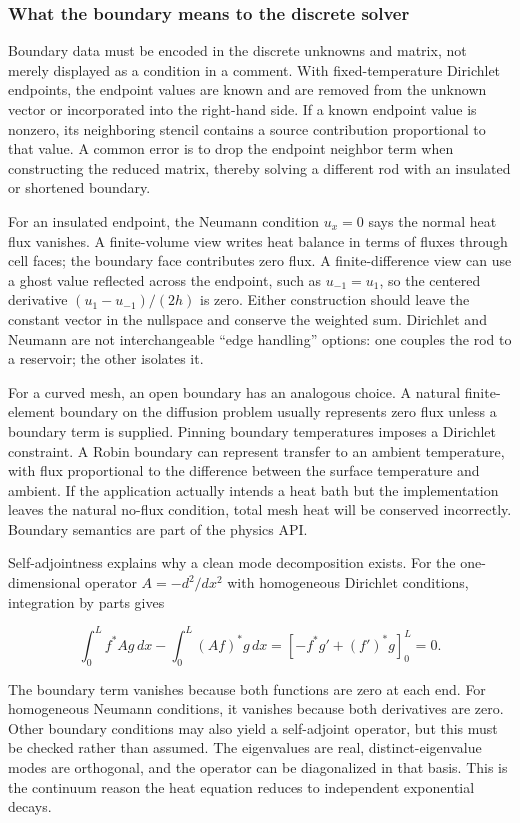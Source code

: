 \subsubsection{What the boundary means to the discrete solver}\label{02-foundations-ii-ch025-what-the-boundary-means-to-the-discrete-solver}

Boundary data must be encoded in the discrete unknowns and matrix, not merely displayed as a condition in a comment. With fixed-temperature Dirichlet endpoints, the endpoint values are known and are removed from the unknown vector or incorporated into the right-hand side. If a known endpoint value is nonzero, its neighboring stencil contains a source contribution proportional to that value. A common error is to drop the endpoint neighbor term when constructing the reduced matrix, thereby solving a different rod with an insulated or shortened boundary.

For an insulated endpoint, the Neumann condition \(u_x=0\) says the normal heat flux vanishes. A finite-volume view writes heat balance in terms of fluxes through cell faces; the boundary face contributes zero flux. A finite-difference view can use a ghost value reflected across the endpoint, such as \(u_{-1}=u_1\), so the centered derivative \((u_1-u_{-1})/(2h)\) is zero. Either construction should leave the constant vector in the nullspace and conserve the weighted sum. Dirichlet and Neumann are not interchangeable ``edge handling'' options: one couples the rod to a reservoir; the other isolates it.

For a curved mesh, an open boundary has an analogous choice. A natural finite-element boundary on the diffusion problem usually represents zero flux unless a boundary term is supplied. Pinning boundary temperatures imposes a Dirichlet constraint. A Robin boundary can represent transfer to an ambient temperature, with flux proportional to the difference between the surface temperature and ambient. If the application actually intends a heat bath but the implementation leaves the natural no-flux condition, total mesh heat will be conserved incorrectly. Boundary semantics are part of the physics API.

Self-adjointness explains why a clean mode decomposition exists. For the one-dimensional operator \(A=-d^2/dx^2\) with homogeneous Dirichlet conditions, integration by parts gives

\[
\int_0^L f^*Ag\,dx-\int_0^L(Af)^*g\,dx
=\left[-f^*g'+(f')^*g\right]_0^L=0.
\]

The boundary term vanishes because both functions are zero at each end. For homogeneous Neumann conditions, it vanishes because both derivatives are zero. Other boundary conditions may also yield a self-adjoint operator, but this must be checked rather than assumed. The eigenvalues are real, distinct-eigenvalue modes are orthogonal, and the operator can be diagonalized in that basis. This is the continuum reason the heat equation reduces to independent exponential decays.

